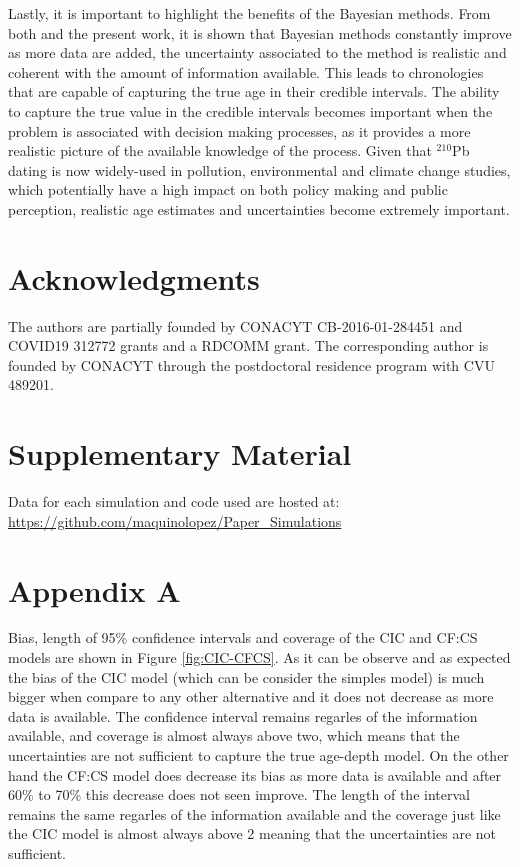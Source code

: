 \documentclass [10pt] {article}
\begin{document}
Lastly, it is important to highlight the benefits of the Bayesian methods.
From both \citet{Blaauw2018} and the present work, it is shown that Bayesian methods constantly improve as more data are added, the uncertainty associated to the method is realistic and coherent with the amount of information available. This leads to chronologies that are capable of capturing the true age in their credible intervals. 
The ability to capture the true value in the credible intervals becomes important when the problem is associated with decision making processes, as it provides a more realistic picture of the available knowledge of the process. 
Given that $^{210}$Pb dating is now widely-used in pollution, environmental and climate change studies, which potentially have a high impact on both policy making and public perception, realistic age estimates and uncertainties become extremely important. 



\section{Acknowledgments}

The authors are partially founded by CONACYT CB-2016-01-284451 and COVID19 312772 grants and a RDCOMM grant.
The corresponding author is founded by CONACYT through the postdoctoral residence program with CVU  489201.




\newpage




\section{Supplementary Material}
\label{sec:supp_mat}
Data for each simulation and code used are hosted at: \url{https://github.com/maquinolopez/Paper_Simulations}

\section{Appendix A}

Bias, length of 95\% confidence intervals and coverage of the CIC and CF:CS models are shown in Figure \ref{fig:CIC-CFCS}.
As it can be observe and as expected the bias of the CIC model (which can be consider the simples model) is much bigger when compare to any other alternative and it does not decrease as more data is available.
The confidence interval remains regarles of the information available, and coverage is almost always above two, which means that the uncertainties are not sufficient to capture the true age-depth model.
On the other hand the CF:CS model does decrease its bias as more data is available and after 60\% to 70\% this decrease does not seen improve.
The length of the interval remains the same regarles of the information available and the coverage just like the CIC model is almost always above 2 meaning that the uncertainties are not sufficient.
\end{document}
